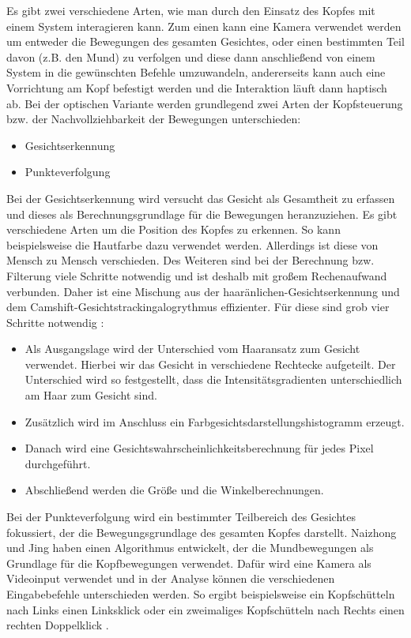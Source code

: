 Es gibt zwei verschiedene Arten, wie man durch den Einsatz des Kopfes mit einem System interagieren kann. Zum einen kann eine Kamera verwendet werden um entweder die Bewegungen des gesamten Gesichtes, oder einen bestimmten Teil davon (z.B. den Mund) zu verfolgen und diese dann anschließend von einem System in die gewünschten Befehle umzuwandeln, andererseits kann auch eine Vorrichtung am Kopf befestigt werden und die Interaktion läuft dann haptisch ab.
\newline \newline
Bei der optischen Variante werden grundlegend zwei Arten der Kopfsteuerung bzw. der Nachvollziehbarkeit der Bewegungen unterschieden:
\begin{itemize}
      \item Gesichtserkennung
      \item Punkteverfolgung
\end{itemize}
\newline
Bei der Gesichtserkennung wird versucht das Gesicht als Gesamtheit zu erfassen und dieses als Berechnungsgrundlage für die Bewegungen heranzuziehen. Es gibt verschiedene Arten um die Position des Kopfes zu erkennen. So kann beispielsweise die Hautfarbe dazu verwendet werden. Allerdings ist diese von Mensch zu Mensch verschieden. Des Weiteren sind bei der Berechnung bzw. Filterung viele Schritte notwendig und ist deshalb mit großem Rechenaufwand verbunden. Daher ist eine Mischung aus der haaränlichen-Gesichtserkennung und dem Camshift-Gesichtstrackingalogrythmus effizienter. Für diese sind grob vier Schritte notwendig \cite{FaceTracking}:
\begin{itemize}
      \item Als Ausgangslage wird der Unterschied vom Haaransatz zum Gesicht verwendet. Hierbei wir das Gesicht in verschiedene Rechtecke aufgeteilt. Der Unterschied wird so festgestellt, dass die Intensitätsgradienten unterschiedlich am Haar zum Gesicht sind.
      \item Zusätzlich wird im Anschluss ein Farbgesichtsdarstellungshistogramm erzeugt.
			\item Danach wird eine Gesichtswahrscheinlichkeitsberechnung für jedes Pixel durchgeführt.
			\item Abschließend werden die Größe und die Winkelberechnungen.
\end{itemize}
\newline
Bei der Punkteverfolgung wird ein bestimmter Teilbereich des Gesichtes fokussiert, der die Bewegungsgrundlage des gesamten Kopfes darstellt. Naizhong und Jing \cite{MouthChinaControl} haben einen Algorithmus entwickelt, der die Mundbewegungen als Grundlage für die Kopfbewegungen verwendet. Dafür wird eine Kamera als Videoinput verwendet und in der Analyse können die verschiedenen Eingabebefehle unterschieden werden. So ergibt beispielsweise ein Kopfschütteln nach Links einen Linksklick oder ein zweimaliges Kopfschütteln nach Rechts einen rechten Doppelklick \cite{MouthChinaControl}.
